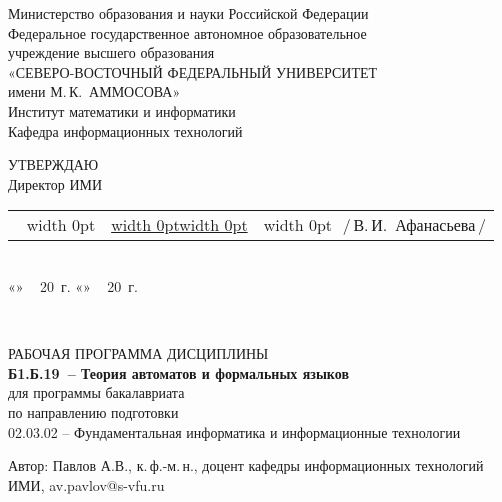 \documentclass[a4paper,12pt]{article}
\makeatletter
\newcommand{\ulfield}[3]{
  \noindent
  \begin{tabularx}{\linewidth}{@{}l@{}X@{}l@{}}
  #1\if\relax\detokenize{#1}\relax\else\,~\vrule width 0pt\fi 
  & \uline{\vrule width 0pt\hfill#2\hfill\vrule width 0pt} & 
  \if\relax\detokenize{#3}\relax\else\vrule width 0pt~\,\fi #3
  \end{tabularx}
  }
\newcommand{\datefield}[1][]{\if
  \relax\detokenize{#1}\relax
  «\uline{\hspace{22pt}}»~\uline{\hspace{90pt}}\,~20\uline{\hspace{20pt}}~г.\else 
  «\uline{\hspace{18pt}}»~\uline{\hspace{60pt}}\,~20\uline{\hspace{18pt}}~г.\fi
  }
\makeatother
\begin{document}
\sloppy
\thispagestyle{empty}

\noindent
\begin{center}
Министерство образования и науки Российской Федерации \\
Федеральное государственное автономное образовательное \\
учреждение высшего образования\\
«СЕВЕРО-ВОСТОЧНЫЙ ФЕДЕРАЛЬНЫЙ УНИВЕРСИТЕТ \\
имени М.\,К.~АММОСОВА» \\
Институт математики и информатики \\
Кафедра информационных технологий

\vspace{12mm}
\begin{flushright}
\parbox{80mm}{
УТВЕРЖДАЮ\\
Директор ИМИ\\[2mm]
\ulfield{}{}{/\,В.\,И.~Афанасьева\,/}{}\\
\datefield
\\[20mm]
}
\end{flushright}


РАБОЧАЯ ПРОГРАММА ДИСЦИПЛИНЫ
\\[2mm]
\textbf{Б1.Б.19\ -- Теория автоматов и формальных языков} 
\\[5mm]

для программы бакалавриата\\
по направлению подготовки \\
02.03.02 -- Фундаментальная информатика и информационные технологии
\\[15mm]


\parbox{\textwidth}{
 Автор: Павлов А.В., к.\,ф.-м.\,н., доцент кафедры информационных технологий ИМИ, av.pavlov@s-vfu.ru

}
\bigskip



\end{center}
\end{document}
